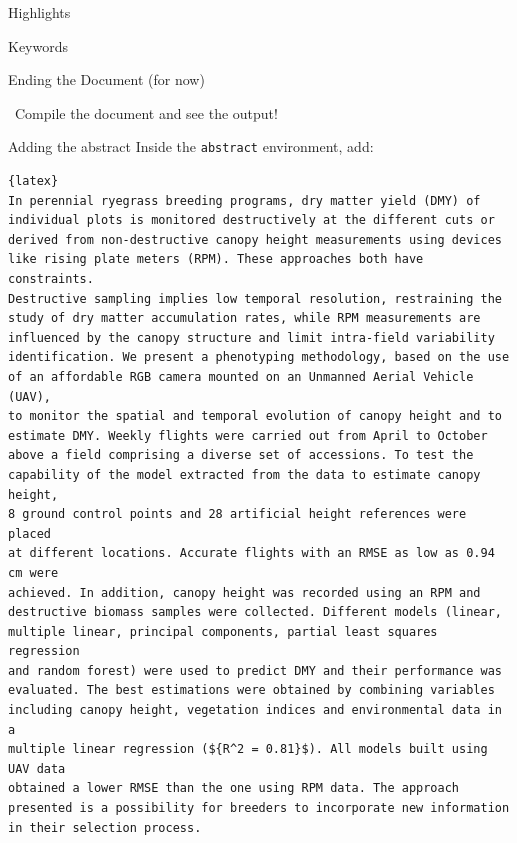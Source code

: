 \documentclass[final,aspectratio=43]{beamer}
\begin{document}
\begin{frame}[fragile]{Highlights}
    
\end{frame}

\begin{frame}[fragile]{Keywords}
    
\end{frame}

\begin{frame}[fragile]{Ending the Document (for now)}



\textrightarrow\ Compile the document and see the output!
\end{frame}

\begin{frame}[fragile]{Adding the abstract}
Inside the \lstinline|abstract| environment, add:
\begin{lstlisting}[basicstyle=\tiny,numbers=none]{latex}
In perennial ryegrass breeding programs, dry matter yield (DMY) of
individual plots is monitored destructively at the different cuts or
derived from non-destructive canopy height measurements using devices
like rising plate meters (RPM). These approaches both have constraints.
Destructive sampling implies low temporal resolution, restraining the
study of dry matter accumulation rates, while RPM measurements are
influenced by the canopy structure and limit intra-field variability
identification. We present a phenotyping methodology, based on the use
of an affordable RGB camera mounted on an Unmanned Aerial Vehicle (UAV),
to monitor the spatial and temporal evolution of canopy height and to
estimate DMY. Weekly flights were carried out from April to October
above a field comprising a diverse set of accessions. To test the
capability of the model extracted from the data to estimate canopy height, 
8 ground control points and 28 artificial height references were placed 
at different locations. Accurate flights with an RMSE as low as 0.94 cm were
achieved. In addition, canopy height was recorded using an RPM and
destructive biomass samples were collected. Different models (linear,
multiple linear, principal components, partial least squares regression
and random forest) were used to predict DMY and their performance was
evaluated. The best estimations were obtained by combining variables
including canopy height, vegetation indices and environmental data in a
multiple linear regression (${R^2 = 0.81}$). All models built using UAV data
obtained a lower RMSE than the one using RPM data. The approach
presented is a possibility for breeders to incorporate new information
in their selection process.
\end{lstlisting}

\end{frame}
\end{document}
